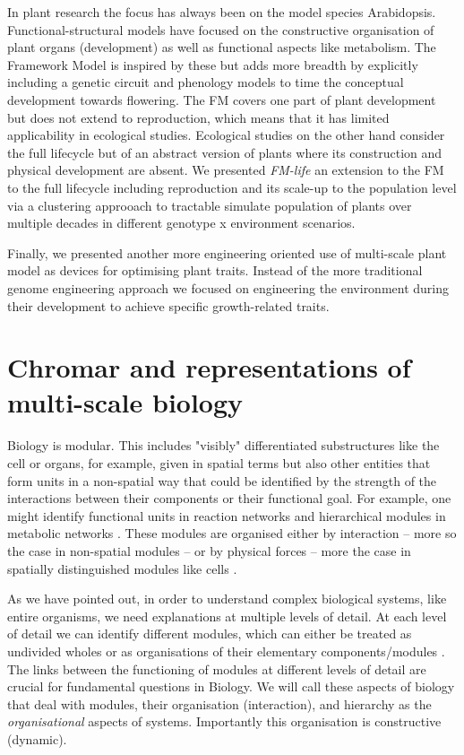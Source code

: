 \documentclass[phd]{infthesis}
\begin{document}
In plant research the focus has always been on the model species
Arabidopsis. Functional-structural models have focused on the constructive
organisation of plant organs (development) as well as functional aspects like
metabolism. The Framework Model is inspired by these but adds more breadth by
explicitly including a genetic circuit and phenology models to time the
conceptual development towards flowering. The FM covers one part of plant
development but does not extend to reproduction, which means that it has limited
applicability in ecological studies. Ecological studies on the other hand
consider the full lifecycle but of an abstract version of plants where its
construction and physical development are absent. We presented \emph{FM-life}
an extension to the FM to the full lifecycle including reproduction and its
scale-up to the population level via a clustering approoach to tractable
simulate population of plants over multiple decades in different genotype x
environment scenarios.

Finally, we presented another more engineering oriented use of multi-scale plant
model as devices for optimising plant traits. Instead of the more traditional
genome engineering approach we focused on engineering the environment during
their development to achieve specific growth-related traits.


\section{Chromar and representations of multi-scale biology}
Biology is modular. This includes "visibly" differentiated substructures like
the cell or organs, for example, given in spatial terms but also other entities
that form units in a non-spatial way that could be identified by the strength of
the interactions between their components or their functional goal. For example,
one might identify functional units in reaction networks
\citep{ederer_approach_2003} and hierarchical modules in metabolic networks
\citep{ravasz_hierarchical_2002}. These modules are organised either by
interaction -- more so the case in non-spatial modules -- or by physical forces
-- more the case in spatially distinguished modules like cells
\citep['Biological and Physical systems' section]{simon1962architecture}.

As we have pointed out, in order to understand complex biological systems, like
entire organisms, we need explanations at multiple levels of detail. At each
level of detail we can identify different modules, which can either be treated
as undivided wholes or as organisations of their elementary components/modules
\citep{varela_autopoiesis:_1974}. The links between the functioning of modules
at different levels of detail are crucial for fundamental questions in
Biology. We will call these aspects of biology that deal with modules, their
organisation (interaction), and hierarchy as the \emph{organisational} aspects
of systems. Importantly this organisation is constructive (dynamic).
\end{document}
